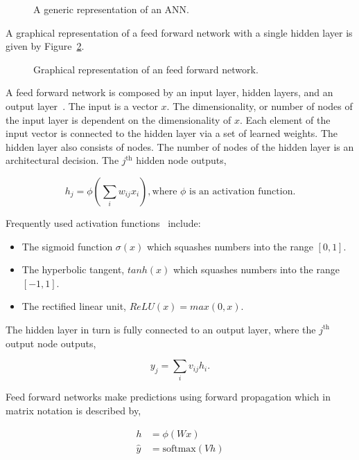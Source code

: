 \begin{figure}[!htbp]
    \centering
    
    \caption{A generic representation of an ANN.}\label{fig:ann}
\end{figure}

A graphical representation of a feed forward network with a single hidden layer
is given by Figure~\ref{fig:feedforward_network}.

\begin{figure}[!htbp]
    \centering
    
    \caption{Graphical representation of an feed forward network.}\label{fig:feedforward_network}
\end{figure}

A feed forward network is composed by an input layer, hidden layers, and an
output layer~\cite{Jain1996, Krose1993}. The input is a vector \(x\). The dimensionality, or
number of nodes of the input layer is dependent on the dimensionality of \(x\).
Each element of the input vector is connected to the hidden layer via a set of
learned weights. The hidden layer also consists of nodes. The number of
nodes of the hidden layer is an architectural decision. The \(j^{\text{th}}\)
hidden node outputs,

\[h_j = \phi (\sum_{i} w_{ij} x_{i}), \text{where } \phi  \text{ is an activation function}.\]

Frequently used activation functions~\cite{Karlik2011, Krose1993} include:

\begin{itemize}
    \item The sigmoid function \(\sigma(x)\) which squashes numbers into the range \([0, 1]\).
    \item The hyperbolic tangent, \(tanh(x)\) which squashes numbers into the range \([-1, 1]\).
    \item The rectified linear unit, \(ReLU(x)=max(0,x)\).
\end{itemize}

The hidden layer in turn is fully connected to an output layer, where the
\(j^{\text{th}}\) output node outputs,

\[y_{j} = \sum_{i} v_{ij} h_{i}.\]

Feed forward networks make predictions using forward propagation which in matrix
notation is described by,

\begin{align}\label{eq:neural_network_equations}
h & = \phi(Wx) \\ \label{eq:neural_network_equations_two}
\hat{y} & = \text{softmax}(Vh)
\end{align}

